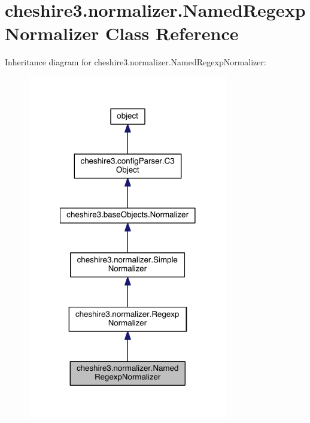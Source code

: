 \hypertarget{classcheshire3_1_1normalizer_1_1_named_regexp_normalizer}{\section{cheshire3.\-normalizer.\-Named\-Regexp\-Normalizer Class Reference}
\label{classcheshire3_1_1normalizer_1_1_named_regexp_normalizer}
}


Inheritance diagram for cheshire3.\-normalizer.\-Named\-Regexp\-Normalizer\-:
\nopagebreak
\begin{figure}[H]
\begin{center}
\leavevmode
\includegraphics[width=248pt]{classcheshire3_1_1normalizer_1_1_named_regexp_normalizer__inherit__graph}
\end{center}
\end{figure}


